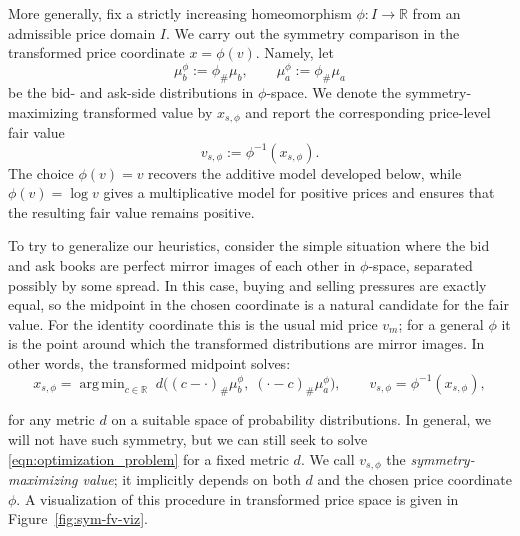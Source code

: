 \documentclass[11pt]{article}
\theoremstyle{plain}
\theoremstyle{definition}
\numberwithin{equation}{section}
\newcommand{\R}{\mathbb{R}}
\DeclareMathOperator*{\argmin}{arg\,min}
\begin{document}
More generally, fix a strictly increasing homeomorphism $\phi:I\to\mathbb R$ from
an admissible price domain $I$. We carry out the symmetry comparison in the
transformed price coordinate $x=\phi(v)$. Namely, let
%
\[\mu_b^\phi:=\phi_\#\mu_b, \qquad \mu_a^\phi:=\phi_\#\mu_a\]
%
\noindent be the bid- and ask-side distributions in $\phi$-space. We denote the
symmetry-maximizing transformed value by $x_{s,\phi}$ and report the corresponding
price-level fair value
%
\[v_{s,\phi}:=\phi^{-1}(x_{s,\phi}).\]
%
\noindent The choice $\phi(v)=v$ recovers the additive model developed below,
while $\phi(v)=\log v$ gives a multiplicative model for positive prices and
ensures that the resulting fair value remains positive.

To try to generalize our heuristics, consider the simple situation where the bid
and ask books are perfect mirror images of each other in $\phi$-space, separated possibly by some spread. In this case, buying and selling pressures are exactly equal, so the midpoint in the chosen coordinate is a natural candidate for the fair value. For the identity coordinate this is the usual mid price $v_m$; for a general $\phi$ it is the point around which the transformed distributions are mirror images. In other words, the transformed midpoint solves:
%
\begin{equation}
    x_{s,\phi} = \argmin_{c \in \R} \; d\bigl((c-\cdot)_\#\mu_b^\phi, \; (\cdot-c)_\#\mu_a^\phi\bigr),
    \qquad v_{s,\phi}=\phi^{-1}(x_{s,\phi}),
    \label{eqn:optimization_problem}
\end{equation}

%
\noindent for any metric $d$ on a suitable space of probability distributions.
 In general, we will not have such symmetry, but we can still seek to
 solve \eqref{eqn:optimization_problem} for a fixed metric $d$.
 We call $v_{s,\phi}$ the \textit{symmetry-maximizing value}; it implicitly
 depends on both $d$ and the chosen price coordinate $\phi$. A visualization of
 this procedure in transformed price space is given in Figure~\ref{fig:sym-fv-viz}.
\end{document}
